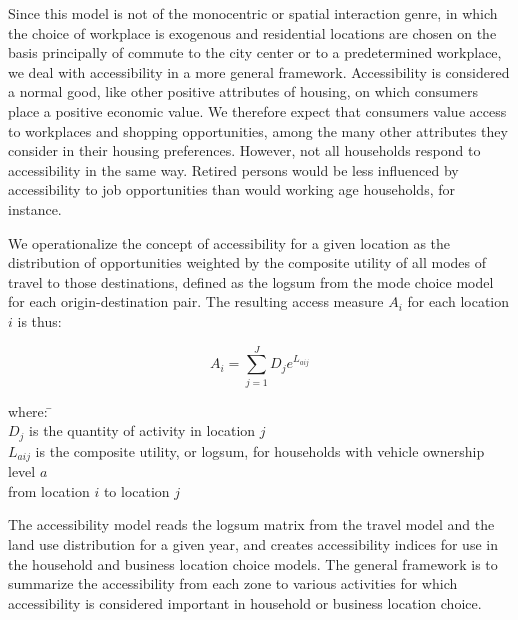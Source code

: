 \documentclass[fleqn]{article}
\begin{document}
Since this model is not of the monocentric or spatial interaction
genre, in which the choice of workplace is exogenous and
residential locations are chosen on the basis principally of
commute to the city center or to a predetermined workplace, we
deal with accessibility in a more general framework.  Accessibility
is considered a normal good, like other positive attributes of
housing, on which consumers place a positive economic value.  We
therefore expect that consumers value access to workplaces and
shopping opportunities, among the many other attributes they
consider in their housing preferences. However, not all households
respond to accessibility in the same way. Retired persons would be
less influenced by accessibility to job opportunities than would
working age households, for instance.


We operationalize the concept of accessibility for a given
location as the distribution of opportunities weighted by the
composite utility of all modes of travel to those destinations,
defined as the logsum from the mode choice model for each
origin-destination pair. The resulting access measure $A_i$ for
each location $i$ is thus:

\begin{equation}
A_i = \sum_{j=1}^{J} D_j e^{L_{aij}} \end{equation}

\begin{tabbing}

where: \= \hspace*{1cm} \= \\
\> $D_j$ is the quantity of activity in location $j$ \\

\> $L_{aij}$ is the composite utility, or logsum, for households with vehicle
ownership level $a$ \\
\> \> from location $i$ to location $j$ \\
\end{tabbing}

The accessibility model reads the logsum matrix from the travel
model and the land use distribution for a given year, and creates
accessibility indices for use in the household and business
location choice models. The general framework is to summarize the
accessibility from each zone to various activities for which
accessibility is considered important in household or business
location choice.
\end{document}
